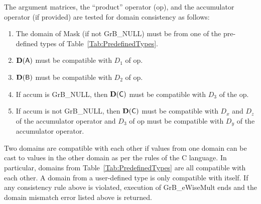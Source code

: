 The argument matrices, the ``product'' operator ({\sf op}), and the accumulator 
operator (if provided) are tested for domain consistency as follows:
\begin{enumerate}
	\item The domain of {\sf Mask} (if not {\sf GrB\_NULL}) must be from one of the pre-defined types of Table~\ref{Tab:PredefinedTypes}.

	\item $\bold{D}({\sf A})$ must be compatible with $D_1$ of {\sf op}.

	\item $\bold{D}({\sf B})$ must be compatible with $D_2$ of {\sf op}.

	\item If {\sf accum} is {\sf GrB\_NULL}, then $\bold{D}({\sf C})$ must be 
    compatible with $D_3$ of the {\sf op}.

	\item If {\sf accum} is not {\sf GrB\_NULL}, then $\bold{D}({\sf C})$ must be
    compatible with $D_x$ and $D_z$ of the accumulator operator and $D_3$ of
    {\sf op} must be compatible with $D_y$ of the accumulator operator.
\end{enumerate}
Two domains are compatible with each other if values from one domain can be cast 
to values in the other domain as per the rules of the C language.
In particular, domains from Table~\ref{Tab:PredefinedTypes} are all compatible 
with each other. A domain from a user-defined type is only compatible with itself.
If any consistency rule above is violated, execution of {\sf GrB\_eWiseMult} ends
and the domain mismatch error listed above is returned.


